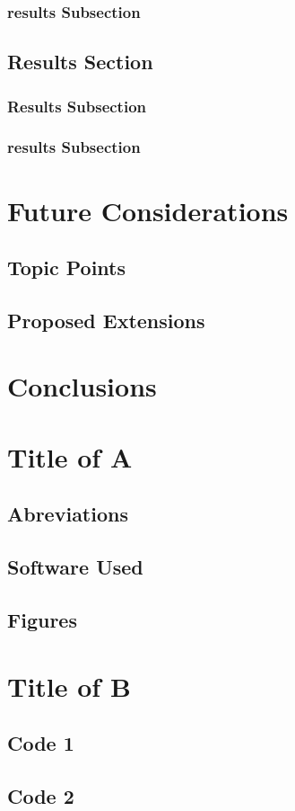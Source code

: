 \documentclass[a4paper,twoside,12pt]{book}
\begin{document}
				\subsection{results Subsection}
			\section{Results Section}
				\subsection{Results Subsection}
				\subsection{results Subsection}	
		\chapter{Future Considerations} 
			\section{Topic Points}  \clearpage
			\section{Proposed Extensions} 
		\chapter{Conclusions} 
	
	\appendix
		\chapter{Title of A}
			\section{Abreviations} %
			\section{Software Used} %
			\section{Figures} %
		\chapter{Title of B}
			\section {Code 1}
			\section {Code 2}

	\backmatter
		
		

	
\end{document}
